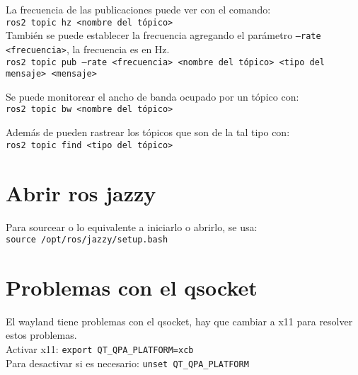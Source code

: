 \documentclass{report}
\begin{document}
La frecuencia de las publicaciones puede ver con el comando:
\\\texttt{ros2 topic hz <nombre del tópico>}
\\También se puede establecer la frecuencia agregando el parámetro \texttt{--rate <frecuencia>},
la frecuencia es en Hz.
\\\texttt{ros2 topic pub --rate <frecuencia> <nombre del tópico> <tipo del mensaje> <mensaje>}

Se puede monitorear el ancho de banda ocupado por un tópico con:
\\\texttt{ros2 topic bw <nombre del tópico>}

Además de pueden rastrear los tópicos que son de la tal tipo con:
\\\texttt{ros2 topic find <tipo del tópico>}

\appendix
\chapter{Abrir ros jazzy}
Para sourcear o lo equivalente a iniciarlo o abrirlo, se usa:
\\\texttt{source /opt/ros/jazzy/setup.bash}

\chapter{Problemas con el qsocket}
El wayland tiene problemas con el qsocket, hay que cambiar a x11 para resolver estos problemas.
\\Activar x11: \texttt{export QT\_QPA\_PLATFORM=xcb}
\\Para desactivar si es necesario: \texttt{unset QT\_QPA\_PLATFORM}
\end{document}
